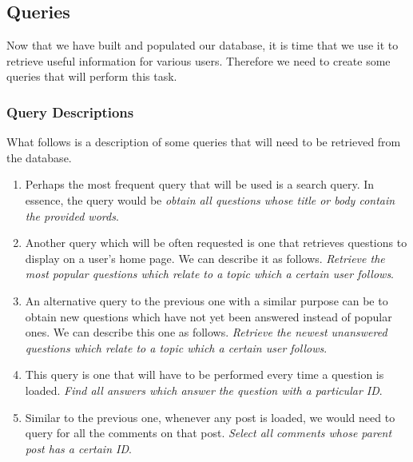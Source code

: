 \subsection{Queries}

Now that we have built and populated our database, it is time that we use it to retrieve useful information for various users. Therefore we need to create some queries that will perform this task.

\subsubsection{Query Descriptions}

What follows is a description of some queries that will need to be retrieved from the database.

\begin{enumerate}
	\item
	Perhaps the most frequent query that will be used is a search query. In essence, the query would be \emph{obtain all questions whose title or body contain the provided words}.

	\item
	Another query which will be often requested is one that retrieves questions to display on a user's home page. We can describe it as follows. \emph{Retrieve the most popular questions which relate to a topic which a certain user follows}.

	\item
	An alternative query to the previous one with a similar purpose can be to obtain new questions which have not yet been answered instead of popular ones. We can describe this one as follows. \emph{Retrieve the newest unanswered questions which relate to a topic which a certain user follows}.

	\item
	This query is one that will have to be performed every time a question is loaded. \emph{Find all answers which answer the question with a particular ID}.

	\item
	Similar to the previous one, whenever any post is loaded, we would need to query for all the comments on that post. \emph{Select all comments whose parent post has a certain ID}.
\end{enumerate}